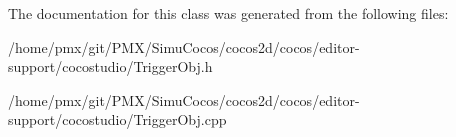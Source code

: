The documentation for this class was generated from the following files\+:\begin{DoxyCompactItemize}
\item 
/home/pmx/git/\+P\+M\+X/\+Simu\+Cocos/cocos2d/cocos/editor-\/support/cocostudio/Trigger\+Obj.\+h\item 
/home/pmx/git/\+P\+M\+X/\+Simu\+Cocos/cocos2d/cocos/editor-\/support/cocostudio/Trigger\+Obj.\+cpp\end{DoxyCompactItemize}

